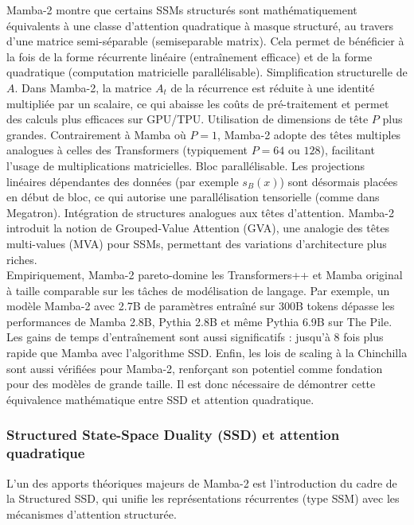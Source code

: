 Mamba-2 montre que certains SSMs structurés sont mathématiquement équivalents à une classe d’attention quadratique à masque structuré, au travers d'une matrice semi-séparable (semiseparable matrix). Cela permet de bénéficier à la fois de la forme récurrente linéaire (entraînement efficace) et de la forme quadratique (computation matricielle parallélisable). Simplification structurelle de $A$. Dans Mamba-2, la matrice $A_t$ de la récurrence est réduite à une identité multipliée par un scalaire, ce qui abaisse les coûts de pré-traitement et permet des calculs plus efficaces sur GPU/TPU. Utilisation de dimensions de tête $P$ plus grandes. Contrairement à Mamba où $P = 1$, Mamba-2 adopte des têtes multiples analogues à celles des Transformers (typiquement $P = 64$ ou $128$), facilitant l’usage de multiplications matricielles. Bloc parallélisable. Les projections linéaires dépendantes des données (par exemple $s_B(x)$) sont désormais placées en début de bloc, ce qui autorise une parallélisation tensorielle (comme dans Megatron). Intégration de structures analogues aux têtes d’attention. Mamba-2 introduit la notion de Grouped-Value Attention (GVA), une analogie des têtes multi-values (MVA) pour SSMs, permettant des variations d’architecture plus riches.\\

Empiriquement, Mamba-2 pareto-domine les Transformers++ et Mamba original à taille comparable sur les tâches de modélisation de langage. Par exemple, un modèle Mamba-2 avec 2.7B de paramètres entraîné sur 300B tokens dépasse les performances de Mamba 2.8B, Pythia 2.8B et même Pythia 6.9B sur The Pile. Les gains de temps d'entraînement sont aussi significatifs : jusqu’à 8 fois plus rapide que Mamba avec l’algorithme SSD. Enfin, les lois de scaling à la Chinchilla sont aussi vérifiées pour Mamba-2, renforçant son potentiel comme fondation pour des modèles de grande taille. Il est donc nécessaire de démontrer cette équivalence mathématique entre SSD et attention quadratique.

\subsubsection{Structured State-Space Duality (SSD) et attention quadratique}

L'un des apports théoriques majeurs de Mamba-2 est l'introduction du cadre de la Structured SSD, qui unifie les représentations récurrentes (type SSM) avec les mécanismes d'attention structurée.\\

